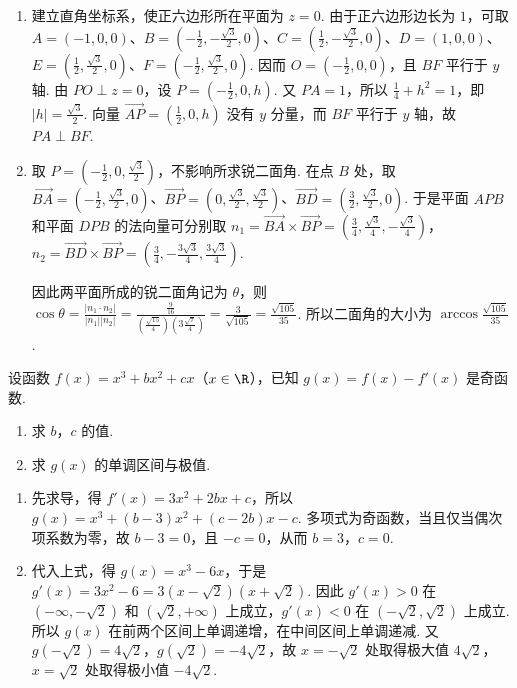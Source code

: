 \begin{solution}
\begin{enumerate}
\item 建立直角坐标系，使正六边形所在平面为 \(z=0\). 由于正六边形边长为 \(1\)，可取
\(A=(-1,0,0)\)、\(B=\left(-\frac12,-\frac{\sqrt3}{2},0\right)\)、\(C=\left(\frac12,-\frac{\sqrt3}{2},0\right)\)、\(D=(1,0,0)\)、\(E=\left(\frac12,\frac{\sqrt3}{2},0\right)\)、\(F=\left(-\frac12,\frac{\sqrt3}{2},0\right)\). 因而 \(O=\left(-\frac12,0,0\right)\)，且 \(BF\) 平行于 \(y\) 轴. 由 \(PO\perp z=0\)，设 \(P=\left(-\frac12,0,h\right)\). 又 \(PA=1\)，所以 \(\frac14+h^2=1\)，即 \(|h|=\frac{\sqrt3}{2}\). 向量 \(\overrightarrow{AP}=\left(\frac12,0,h\right)\) 没有 \(y\) 分量，而 \(BF\) 平行于 \(y\) 轴，故 \(PA\perp BF\).
\item 取 \(P=\left(-\frac12,0,\frac{\sqrt3}{2}\right)\)，不影响所求锐二面角. 在点 \(B\) 处，取
\(\overrightarrow{BA}=\left(-\frac12,\frac{\sqrt3}{2},0\right)\)、\(\overrightarrow{BP}=\left(0,\frac{\sqrt3}{2},\frac{\sqrt3}{2}\right)\)、\(\overrightarrow{BD}=\left(\frac32,\frac{\sqrt3}{2},0\right)\). 于是平面 \(APB\) 和平面 \(DPB\) 的法向量可分别取
\(n_1=\overrightarrow{BA}\times\overrightarrow{BP}=\left(\frac34,\frac{\sqrt3}{4},-\frac{\sqrt3}{4}\right)\)，
\(n_2=\overrightarrow{BD}\times\overrightarrow{BP}=\left(\frac34,-\frac{3\sqrt3}{4},\frac{3\sqrt3}{4}\right)\).

因此两平面所成的锐二面角记为 \(\theta\)，则
\(\cos\theta=\frac{|n_1\cdot n_2|}{|n_1||n_2|}=\frac{\frac{9}{16}}{(\frac{\sqrt{15}}{4})(3\frac{\sqrt7}{4})}=\frac{3}{\sqrt{105}}=\frac{\sqrt{105}}{35}\). 所以二面角的大小为 \(\arccos\frac{\sqrt{105}}{35}\).
\end{enumerate}
\end{solution}

\begin{problem}
设函数 \( f(x) = x^3 + bx^2 + cx \)（\(x \in \R\)），已知 \( g(x) = f(x) - f'(x) \) 是奇函数.

\begin{enumerate}
\item 求 \(b\)，\(c\) 的值.
\item 求 \( g(x) \) 的单调区间与极值.
\end{enumerate}
\end{problem}

\begin{solution}
\begin{enumerate}
\item 先求导，得 \(f'(x)=3x^2+2bx+c\)，所以 \(g(x)=x^3+(b-3)x^2+(c-2b)x-c\). 多项式为奇函数，当且仅当偶次项系数为零，故 \(b-3=0\)，且 \(-c=0\)，从而 \(b=3\)，\(c=0\).
\item 代入上式，得 \(g(x)=x^3-6x\)，于是 \(g'(x)=3x^2-6=3(x-\sqrt2)(x+\sqrt2)\). 因此 \(g'(x)>0\) 在 \((-\infty,-\sqrt2)\) 和 \((\sqrt2,+\infty)\) 上成立，\(g'(x)<0\) 在 \((-\sqrt2,\sqrt2)\) 上成立. 所以 \(g(x)\) 在前两个区间上单调递增，在中间区间上单调递减. 又 \(g(-\sqrt2)=4\sqrt2\)，\(g(\sqrt2)=-4\sqrt2\)，故 \(x=-\sqrt2\) 处取得极大值 \(4\sqrt2\)，\(x=\sqrt2\) 处取得极小值 \(-4\sqrt2\).
\end{enumerate}
\end{solution}

